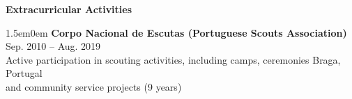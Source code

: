 \noindent\textbf{Extracurricular Activities}
\noindent\hrulefill
\vspace{0.25em}
\begin{adjustwidth}{1.5em}{0em}
\textbf{Corpo Nacional de Escutas (Portuguese Scouts Association)} \hfill Sep. 2010 -- Aug. 2019 \\
Active participation in scouting activities, including camps, ceremonies \hfill Braga, Portugal\\
and community service projects \hfill (9 years)\\
\end{adjustwidth}
\vspace{0.25em}